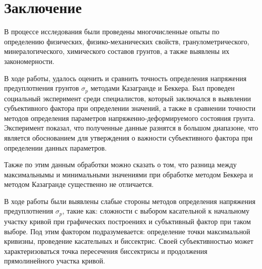 \chapter*{Заключение}                       %


В процессе исследования были проведены многочисленные опыты по определению физических, физико-механических свойств, гранулометрического, минералогического, химического составов грунтов, а также выявлены их закономерности. 

В ходе работы, удалось оценить и сравнить точность определения напряжения предуплотнения грунтов $\sigma_p$ методами Казагранде и Беккера. Был проведен социальный эксперимент среди специалистов, который заключался в выявлении субъективного фактора при определении значений, а также в сравнении точности методов определения параметров напряженно-деформируемого состояния грунта. Эксперимент показал, что полученные данные разнятся в большом диапазоне, что является обоснованием для утверждения о важности субъективного фактора при определении данных параметров.

Также по этим данным обработки можно сказать о том, что разница между максимальнымы и минимальными значениями при обработке методом Беккера и методом Казагранде существенно не отличается.

В ходе работы были выявлены слабые стороны методов определения напряжения предуплотнения $\sigma_p$, такие как: сложности с выбором касательной к начальному участку кривой при графических построениях и субъктивный фактор при таком выборе. Под этим фактором подразумевается: определение точки максимальной кривизны, проведение касательных и биссектрис. Своей субъективностью может характеризоваться точка пересечения биссектрисы и продолжения прямолинейного участка кривой.


